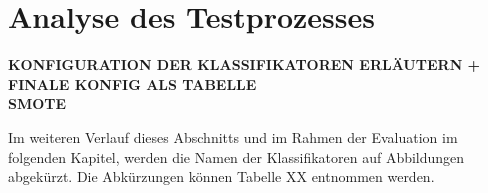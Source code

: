 \section{Analyse des Testprozesses}

\textbf{KONFIGURATION DER KLASSIFIKATOREN ERLÄUTERN + FINALE KONFIG ALS TABELLE}\\\textbf{SMOTE}

Im weiteren Verlauf dieses Abschnitts und im Rahmen der Evaluation im folgenden Kapitel, werden die Namen der Klassifikatoren auf Abbildungen abgekürzt. Die Abkürzungen können Tabelle XX entnommen werden.

\begin{table}
\centering
\caption{Zuordnung der verwendeten Abkürzungen}
\label{tab:abbs}
\end{table}

